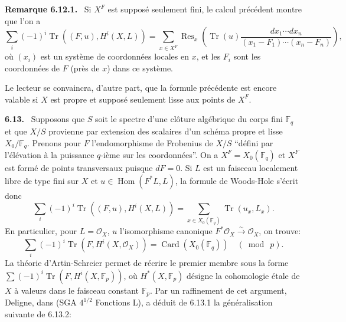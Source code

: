 \documentclass[11pt]{article}
\newenvironment{statement}[1]{\par\medskip\noindent\textbf{#1.}\ }{\par\medskip}
\DeclareMathOperator{\Hom}{Hom}
\providecommand{\Tr}{\operatorname{Tr}}
\providecommand{\OO}{\mathcal O}
\providecommand{\Res}{\operatorname{Res}}
\providecommand{\Card}{\operatorname{Card}}
\begin{document}
\begin{statement}{Remarque 6.12.1}
Si $X^F$ est supposé seulement fini, le calcul précédent montre que l'on a
\[
\sum_i(-1)^i\Tr((F,u),H^i(X,L))=
\sum_{x\in X^F}\Res_x\left(\Tr(u)\frac{dx_1\cdots dx_n}{(x_1-F_1)\cdots(x_n-F_n)}\right),
\]
où $(x_i)$ est un système de coordonnées locales en $x$, et les $F_i$ sont les coordonnées de $F$ (près de $x$) dans ce système.

Le lecteur se convaincra, d'autre part, que la formule précédente est encore valable si $X$ est propre et supposé seulement lisse aux points de $X^F$.
\end{statement}

\begin{statement}{6.13}
Supposons que $S$ soit le spectre d'une clôture algébrique du corps fini $\mathbb F_q$ et que $X/S$ provienne par extension des scalaires d'un schéma propre et lisse $X_0/\mathbb F_q$. Prenons pour $F$ l'endomorphisme de Frobenius de $X/S$ ``défini par l'élévation à la puissance $q$-ième sur les coordonnées''. On a $X^F=X_0(\mathbb F_q)$ et $X^F$ est formé de points transversaux puisque $dF=0$. Si $L$ est un faisceau localement libre de type fini sur $X$ et $u\in\Hom(F^*L,L)$, la formule de Woods-Hole s'écrit donc
\begin{equation}
\tag{6.13.1}
\sum_i(-1)^i\Tr((F,u),H^i(X,L))=
\sum_{x\in X_0(\mathbb F_q)}\Tr(u_x,L_x).
\end{equation}
En particulier, pour $L=\OO_X$, $u$ l'isomorphisme canonique $F^*\OO_X\xrightarrow{\sim}\OO_X$, on trouve:
\begin{equation}
\tag{6.13.2}
\sum_i(-1)^i\Tr(F,H^i(X,\OO_X))=\Card(X_0(\mathbb F_q))\quad (\bmod\ p).
\end{equation}
La théorie d'Artin-Schreier permet de récrire le premier membre sous la forme $\sum(-1)^i\Tr(F,H^i(X,\mathbb F_p))$, où $H^*(X,\mathbb F_p)$ désigne la cohomologie étale de $X$ à valeurs dans le faisceau constant $\mathbb F_p$. Par un raffinement de cet argument, Deligne, dans (SGA $4^{1/2}$ Fonctions L), a déduit de 6.13.1 la généralisation suivante de 6.13.2:
\end{statement}
\end{document}
